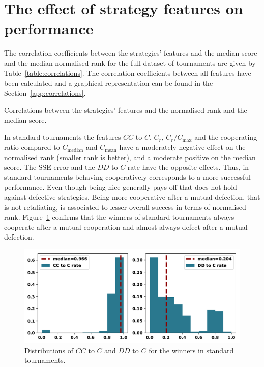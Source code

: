\section{The effect of strategy features on performance}

The correlation coefficients between the strategies' features and the median
score and the median normalised rank for the full dataset of tournaments are
given by Table~\ref{table:correlations}. The correlation coefficients between
all features have been calculated and a graphical representation can be found in
the Section~\ref{app:correlations}.

\begin{table}[!htbp]
    \begin{center}
    \resizebox{.9\textwidth}{!}{
        
    }
\end{center}
\caption{Correlations between the strategies' features
and the normalised rank and the median score.}\label{table:correlations}
\end{table}

In standard tournaments the features $CC$ to $C$, $C_r$, $C_r / C_{\text{max}}$
and the cooperating ratio compared to $C_{\text{median}}$ and $C_{\text{mean}}$
have a moderately negative effect on the normalised rank (smaller rank is
better), and a moderate positive on the median score. The SSE error and the $DD$
to $C$ rate have the opposite effects. Thus, in standard tournaments behaving
cooperatively corresponds to a more successful performance. Even though being
nice generally pays off that does not hold against defective strategies. Being
more cooperative after a mutual defection, that is not retaliating, is
associated to lesser overall success in terms of normalised rank.
Figure~\ref{fig:rates_of_winners_in_standard_tournaments} confirms that the
winners of standard tournaments always cooperate after a mutual cooperation and
almost always defect after a mutual defection.

\begin{figure}[!htbp]
    \centering
    \includegraphics[width=.8\textwidth]{../images/rates_of_winners_in_standard_tournaments.pdf}
    \caption{Distributions of $CC$ to $C$ and $DD$ to $C$ for the winners in
    standard tournaments.}\label{fig:rates_of_winners_in_standard_tournaments}
\end{figure}

